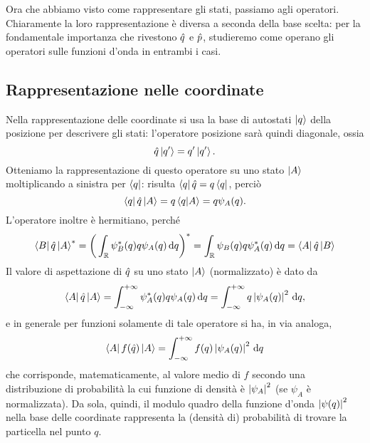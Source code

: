 Ora che abbiamo visto come rappresentare gli stati, passiamo agli operatori.
Chiaramente la loro rappresentazione è diversa a seconda della base scelta: per la fondamentale importanza che rivestono $\hat{q}$ e $\hat{p}$, studieremo come operano gli operatori sulle funzioni d'onda in entrambi i casi.

\subsection{Rappresentazione nelle coordinate}
Nella rappresentazione delle coordinate si usa la base di autostati $\left|{q}\right\rangle$ della posizione per descrivere gli stati: l'operatore posizione sarà quindi diagonale, ossia
\begin{equation}
	\hat{q}\left|{q'}\right\rangle=q'\left|{q'}\right\rangle.
	\label{eq:posizione-diagonale}
\end{equation}
Otteniamo la rappresentazione di questo operatore su uno stato $\left|{A}\right\rangle$ moltiplicando a sinistra per $\left\langle{q}\right|$: risulta $\left\langle{q}\right|\hat{q}=q\left\langle{q}\right|$, perciò
\begin{equation}
	\left\langle{q}\right|\hat{q}\left|{A}\right\rangle=q\left\langle{q}\middle|{A}\right\rangle=q\psi_A(q).
	\label{eq:rappresentazione-posizione-diagonale}
\end{equation}
L'operatore inoltre è hermitiano, perch\'e
\begin{equation}
	\left\langle{B}\right|\hat{q}\left|{A}\right\rangle^*=\bigg(\int_{\mathbb{R}}\psi_B^*(q)q\psi_A(q)\,\textup{d} q\bigg)^*=\int_{\mathbb{R}}\psi_B(q)q\psi_A^*(q)\,\textup{d} q=\left\langle{A}\right|\hat{q}\left|{B}\right\rangle
	\label{eq:posizione-hermitiano}
\end{equation}
Il valore di aspettazione di $\hat{q}$ su uno stato $\left|{A}\right\rangle$ (normalizzato) è dato da
\begin{equation}
	\left\langle{A}\right|\hat{q}\left|{A}\right\rangle=\int_{-\infty}^{+\infty}\psi_A^*(q)q\psi_A(q)\,\textup{d} q=\int_{-\infty}^{+\infty}q\left|{\psi_A(q)}\right|^2\,\textup{d} q,
	\label{eq:valor-medio-posizione}
\end{equation}
e in generale per funzioni solamente di tale operatore si ha, in via analoga,
\begin{equation}
	\left\langle{A}\right|f(\hat{q})\left|{A}\right\rangle=\int_{-\infty}^{+\infty}f(q)\left|{\psi_A(q)}\right|^2\,\textup{d} q
\end{equation}
che corrisponde, matematicamente, al valore medio di $f$ secondo una distribuzione di probabilità la cui funzione di densità è $\left|{\psi_A}\right|^2$ (se $\psi_A$ è normalizzata).
Da sola, quindi, il modulo quadro della funzione d'onda $\left|{\psi(q)}\right|^2$ nella base delle coordinate rappresenta la (densità di) probabilità di trovare la particella nel punto $q$.

